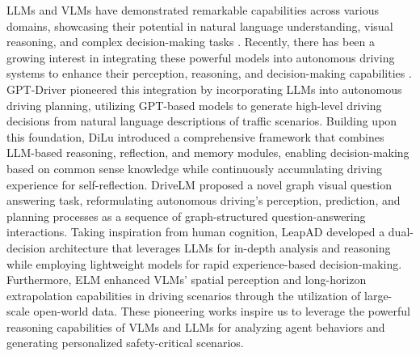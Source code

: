LLMs and VLMs have demonstrated remarkable capabilities across various domains, showcasing their potential in natural language understanding, visual reasoning, and complex decision-making tasks \citep{achiam2023gpt,dubey2024llama}. 
Recently, there has been a growing interest in integrating these powerful models into autonomous driving systems to enhance their perception, reasoning, and decision-making capabilities \citep{zhou2024vision}. 
GPT-Driver \citep{mao2023gpt} pioneered this integration by incorporating LLMs into autonomous driving planning, utilizing GPT-based models to generate high-level driving decisions from natural language descriptions of traffic scenarios. 
Building upon this foundation, DiLu \citep{wen2023dilu} introduced a comprehensive framework that combines LLM-based reasoning, reflection, and memory modules, enabling decision-making based on common sense knowledge while continuously accumulating driving experience for self-reflection. 
DriveLM \citep{sima2023drivelm} proposed a novel graph visual question answering task, reformulating autonomous driving's perception, prediction, and planning processes as a sequence of graph-structured question-answering interactions. 
Taking inspiration from human cognition, LeapAD \citep{mei2024continuously} developed a dual-decision architecture that leverages LLMs for in-depth analysis and reasoning while employing lightweight models for rapid experience-based decision-making. 
Furthermore, ELM \citep{zhou2024embodied} enhanced VLMs' spatial perception and long-horizon extrapolation capabilities in driving scenarios through the utilization of large-scale open-world data.
These pioneering works inspire us to leverage the powerful reasoning capabilities of VLMs and LLMs for analyzing agent behaviors and generating personalized safety-critical scenarios.